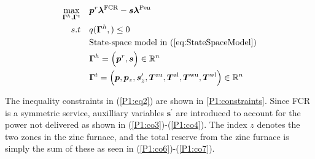 \documentclass[lettersize,journal]{IEEEtran}
\begin{document}
\begin{subequations}\label{P1:compact_model_fcr}
    \begin{align}
        \underset{\bm{\Gamma}^{h},\bm{\Gamma}^{t}}{\textrm{max}} \quad & \bm{p}^{r} \bm{\lambda}^{\text{FCR}} - \bm{s}\bm{\lambda}^{\text{Pen}} \label{P1:eq1}
        \\
        s.t \quad                                                      & q(\bm{\Gamma}^{h}, ) \leq 0 \label{P1:eq2}                                                                                                                                                  \\
        \quad                                                          & \text{State-space model in } (\ref{eq:StateSpaceModel}) \label{P1:eq8}                                                                                                                      \\
        \quad
                                                                       & \bm{\Gamma}^{h} = \Bigl( \bm{p}^{r}, \bm{s} \Bigr) \in \mathbb{R}^{n}  \label{P1:eq9}                                                                                                       \\
        \quad
                                                                       & \bm{\Gamma}^{t} = \Bigl( \bm{p}, \bm{p}_{z}, \bm{s}^{\prime}_{z}, \bm{T}^{\text{zu}}, \bm{T}^{\text{zl}}, \bm{T}^{\text{wu}}, \bm{T}^{\text{wl}} \Bigr) \in \mathbb{R}^{n}  \label{P1:eq10}
    \end{align}
\end{subequations}

The inequality constraints in (\ref{P1:eq2}) are shown in \ref{P1:constraints}. Since FCR is a symmetric service, auxilliary variables $\bm{s}^{\prime}$ are introduced to account for the power not delivered as shown in (\ref{P1:co3})-(\ref{P1:co4}). The index $z$ denotes the two zones in the zinc furnace, and the total reserve from the zinc furnace is simply the sum of these as seen in (\ref{P1:co6})-(\ref{P1:co7}).
\end{document}
